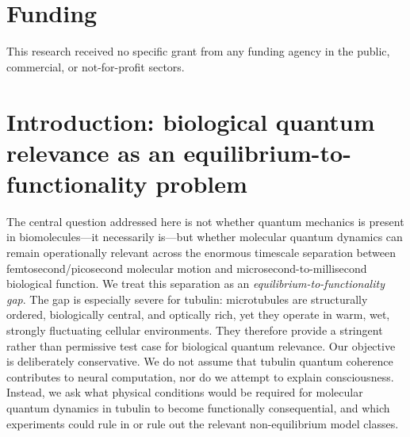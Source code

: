 \documentclass[twocolumn,10pt]{article}
\begin{document}
\section*{Funding}
This research received no specific grant from any funding agency in the public, commercial, or not-for-profit sectors.

\section{Introduction: biological quantum relevance as an equilibrium-to-functionality problem}
The central question addressed here is not whether quantum mechanics is present
in biomolecules---it necessarily is---but whether molecular quantum dynamics can
remain operationally relevant across the enormous timescale separation between
femtosecond/picosecond molecular motion and microsecond-to-millisecond biological
function. We treat this separation as an \emph{equilibrium-to-functionality gap}.
The gap is especially severe for tubulin: microtubules are structurally ordered,
biologically central, and optically rich, yet they operate in warm, wet,
strongly fluctuating cellular environments. They therefore provide a stringent
rather than permissive test case for biological quantum relevance.
Our objective is deliberately conservative. We do not assume that tubulin quantum
coherence contributes to neural computation, nor do we attempt to explain
consciousness. Instead, we ask what physical conditions would be required for
molecular quantum dynamics in tubulin to become functionally consequential, and
which experiments could rule in or rule out the relevant non-equilibrium model
classes.
\end{document}
